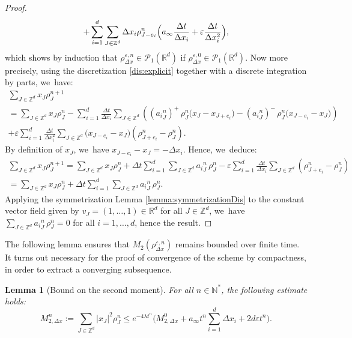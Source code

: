 \documentclass[JEP,XML,SOM,Unicode, NoFloatCountersInSection,published]{cedram}
\def\NN{\mathbb{N}}
\def\RR{\mathbb{R}}
\def\ZZ{\mathbb{Z}}
\def\eps{\varepsilon}
\def\dt{\Delta t}
\def\dx{\Delta x}
\theoremstyle{plain}
\newtheorem{lemma}[theorem]{Lemma}
\theoremstyle{definition}
\begin{document}
\begin{proof}
\begin{multline*}
+ \sum_{i = 1}^d \sum_{J\in \ZZ^d} \Delta x_i\rho_{J - e_i}^{n} \Bigl(a_\infty \frac{\Delta t}{\Delta x_i} + \eps \frac{\Delta t}{\Delta x_i^2}\Bigr),
\end{multline*}
which shows by induction that $\rho_{\Delta x}^{\eps,n} \in \mathcal{P}_1(\RR^d)$ if $\rho_{\Delta x}^{\eps,0} \in \mathcal{P}_1(\RR^d)$.
Now more precisely, using the discretization \eqref{dis:explicit} together with a discrete integration by parts, we~have:\vspace*{-5pt}
\begin{multline*}
\sum_{J\in \ZZ^d} x_J\rho_{J}^{n+1} \\[-3pt]
= \sum_{J\in
\ZZ^d} x_J\rho_{J}^n 
- \sum_{i=1}^d\frac{\dt}{\dx_i} \sum_{J\in
\ZZ^d} \left(({a_i}^n_{J})^+ \, \rho_{J}^n \big(x_J-x_{J+e_i}\big)
-({a_i}^n_{J})^- \, \rho_{J}^n \big(x_{J-e_i}-x_J\big) \right) \\[-3pt]
+ \eps\sum_{i=1}^d\frac{\dt}{\dx_i^2} \sum_{J\in
\ZZ^d} \big(x_{J-e_i}-x_J\big)(\rho_{J+e_i}^n - \rho_{J}^n).
\end{multline*}
By definition of $x_J$, we~have $x_{J-e_i}-x_J = -\dx_i$. Hence, we~deduce:\vspace*{-5pt}
\begin{multline*}
\sum_{J\in \ZZ^d} x_J\rho_{J}^{n+1} = \sum_{J\in \ZZ^d}
x_J\rho_{J}^n + \dt \sum_{i=1}^d \sum_{J\in \ZZ^d} {a_i}^n_{J} \, \rho_{J}^n - \eps\sum_{i=1}^d\frac{\dt}{\dx_i} \sum_{J\in
\ZZ^d}(\rho_{J+e_i}^n - \rho_{J}^n) \\[-3pt]
= \sum_{J\in \ZZ^d}
x_J\rho_{J}^n + \dt \sum_{i=1}^d \sum_{J\in \ZZ^d} {a_i}^n_{J} \, \rho_{J}^n.
\end{multline*}
Applying the symmetrization Lemma \ref{lemma:symmetrizationDis} to the constant vector field given by $v_J = (1, \ldots, 1) \in \RR^d$ for all $J \in \ZZ^d$, we~have $\sum_{J\in \ZZ^d} {a_i}^n_{J} \, \rho_{J}^n = 0$ for all $i=1,\ldots,d$, hence the result.
\end{proof}
The following lemma ensures that $M_2(\rho_{\dx}^{\eps,n})$ remains bounded over finite time. It turns out necessary for the proof of convergence of the scheme by compactness, in order to extract a converging subsequence.
\begin{lemma}[Bound on the second moment]\label{bounddismom}
For all $n\in \NN^*$, the following estimate holds:\vspace*{-3pt}
\begin{equation*}
M_{2,\dx}^n := \sum_{J\in \ZZ^d} |x_J|^2\rho_{J}^n \leq e^{-4 \lambda t^n} \Big(M_{2,\dx}^0 + a_\infty t^n \sum_{i=1}^d \dx_i + 2d\eps t^n\Big).
\end{equation*}
\end{lemma}
\end{document}
